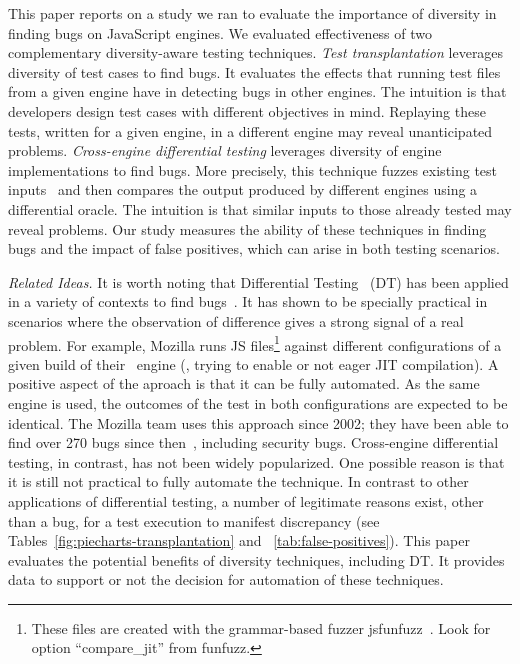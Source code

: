 \documentclass[10pt,conference,anonymous]{IEEEtran}
\begin{document}
This paper reports on a study we ran to evaluate the importance of
diversity in finding bugs on JavaScript engines. We evaluated
effectiveness of two complementary diversity-aware testing
techniques. \emph{Test transplantation} leverages diversity of test
cases to find bugs. It evaluates the effects that running \js{} test
files from a given engine have in detecting bugs in other engines. The
intuition is that developers design test cases with different
objectives in mind. Replaying these tests, written for a given engine,
in a different engine may reveal unanticipated
problems. \emph{Cross-engine differential testing} leverages diversity of engine implementations to find
bugs. More precisely, this technique fuzzes existing test
inputs~\cite{fuzz-testing-history} and then compares the output
produced by different engines using a differential oracle. The
intuition is that similar inputs to those already tested may reveal
problems. Our study measures the ability of these techniques in
finding bugs and the impact of false positives, which
can arise in both testing scenarios.



\emph{Related Ideas.}  It is worth noting that Differential
Testing~\cite{Brumley-etal-ss07} (DT) has been applied in a variety of
contexts to find
bugs~\cite{Yang-etal-pldi11,Chen-etal-fse2015,Argyros-etla-ccs16,Chen-etal-pldi16,petsios-etal-sp2017,SivakornAPKJ17,Zhang:2017:ATD:3097368.3097448}.
It has shown to be specially practical in scenarios where the
observation of difference gives a strong signal of a real problem. For
example, Mozilla runs JS files\footnote{These files are created with
  the grammar-based fuzzer jsfunfuzz~\cite{jsfunfuzz}. Look for option
  ``compare\_jit'' from funfuzz.} against different configurations of
a given build of their \smonkey\ engine (\eg{}, trying to enable or
not eager JIT compilation). A positive aspect of the aproach is that
it can be fully automated. As the same engine is used, the outcomes of
the test in both configurations are expected to be identical. The
Mozilla team uses this approach since 2002; they have been able to
find over 270 bugs since then~\cite{jsfunfuzz-at-mozilla}, including
security bugs. Cross-engine differential testing, in contrast, has not
been widely popularized. One possible reason is that it is still not
practical to fully automate the technique. In contrast to other
applications of differential testing, a number of legitimate reasons
exist, other than a bug, for a test execution to manifest discrepancy
(see Tables~\ref{fig:piecharts-transplantation} and
~\ref{tab:false-positives}). This paper evaluates the potential
benefits of diversity techniques, including DT. It provides data to
support or not the decision for automation of these techniques.
\end{document}
